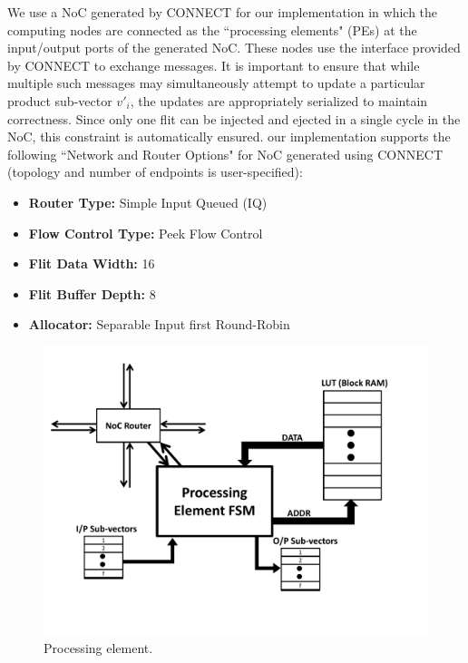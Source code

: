 \documentclass[conference, 9pt]{IEEEtran}
\begin{document}
We use a NoC generated by CONNECT\cite{papamichael2012connect} for our implementation in which the computing nodes are connected as the ``processing elements" (PEs) at the input/output ports of the generated NoC. These nodes use the interface provided by CONNECT to exchange messages. It is important to ensure that while multiple such messages may simultaneously attempt to update a particular product sub-vector $v'_i$, the updates are appropriately serialized to maintain correctness. Since only one flit can be injected and ejected in a single cycle in the NoC, this constraint is automatically ensured. our implementation supports the following ``Network and Router Options" for NoC generated using CONNECT (topology and number of endpoints is user-specified):
\begin{itemize}
	\item \textbf{Router Type:} Simple Input Queued (IQ)
	\item \textbf{Flow Control Type:} Peek Flow Control
	\item \textbf{Flit Data Width:} 16
	\item \textbf{Flit Buffer Depth:} 8
	\item \textbf{Allocator:} Separable Input first Round-Robin
\end{itemize}


\begin{figure}[t!]
\centering
\includegraphics[scale=0.35]{figs/processing_element.pdf}
\caption{Processing element.}
\label{fig:pe}
\end{figure}
\end{document}

